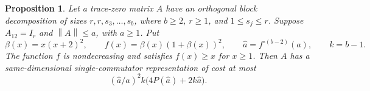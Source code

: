 \documentclass[11pt]{article}
\newtheorem{proposition}[theorem]{Proposition}
\theoremstyle{remark}
\newcommand{\norm}[1]{\left\lVert#1\right\rVert}
\numberwithin{equation}{section}
\begin{document}
\begin{proposition}\label{prop:absorb}
Let a trace-zero matrix $A$ have an orthogonal block decomposition of sizes
$r,r,s_3,\ldots,s_b$, where $b\ge2$, $r\ge1$, and $1\le s_j\le r$.
Suppose $A_{12}=I_r$ and
$\norm A\le a$, with $a\ge1$. Put
\begin{equation}\label{eq:iterate}
 \beta(x)=x(x+2)^2,\qquad f(x)=\beta(x)(1+\beta(x))^2,
 \qquad \widehat a=f^{\circ(b-2)}(a),\qquad k=b-1.
\end{equation}
The function $f$ is nondecreasing and satisfies $f(x)\ge x$ for $x\ge1$.
Then $A$ has a same-dimensional single-commutator representation of cost at most
\begin{equation}\label{eq:absorb}
 (\widehat a/a)^2 k\bigl(4P(\widehat a)+2k\widehat a\bigr).
\end{equation}
\end{proposition}
\end{document}
